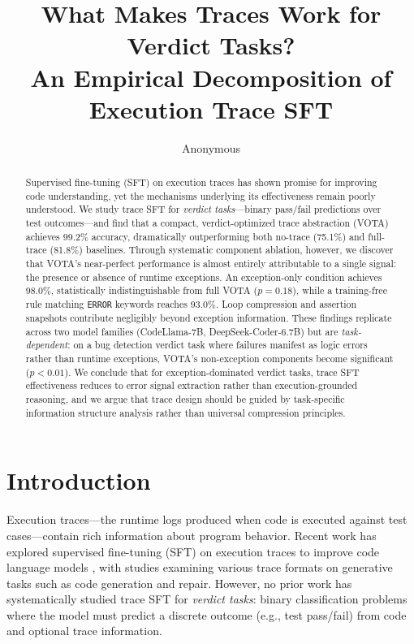 \documentclass[11pt,a4paper]{article}
\title{What Makes Traces Work for Verdict Tasks?\\An Empirical Decomposition of Execution Trace SFT}
\author{Anonymous}
\date{}
\begin{document}
\maketitle

\begin{abstract}
Supervised fine-tuning (SFT) on execution traces has shown promise for improving code understanding, yet the mechanisms underlying its effectiveness remain poorly understood.
We study trace SFT for \emph{verdict tasks}---binary pass/fail predictions over test outcomes---and find that a compact, verdict-optimized trace abstraction (VOTA) achieves 99.2\% accuracy, dramatically outperforming both no-trace (75.1\%) and full-trace (81.8\%) baselines.
Through systematic component ablation, however, we discover that VOTA's near-perfect performance is almost entirely attributable to a single signal: the presence or absence of runtime exceptions.
An exception-only condition achieves 98.0\%, statistically indistinguishable from full VOTA ($p=0.18$), while a training-free rule matching \texttt{ERROR} keywords reaches 93.0\%.
Loop compression and assertion snapshots contribute negligibly beyond exception information.
These findings replicate across two model families (CodeLlama-7B, DeepSeek-Coder-6.7B) but are \emph{task-dependent}: on a bug detection verdict task where failures manifest as logic errors rather than runtime exceptions, VOTA's non-exception components become significant ($p<0.01$).
We conclude that for exception-dominated verdict tasks, trace SFT effectiveness reduces to error signal extraction rather than execution-grounded reasoning, and we argue that trace design should be guided by task-specific information structure analysis rather than universal compression principles.
\end{abstract}

\section{Introduction}
\label{sec:intro}

Execution traces---the runtime logs produced when code is executed against test cases---contain rich information about program behavior.
Recent work has explored supervised fine-tuning (SFT) on execution traces to improve code language models \cite{ni2024next,jain2024traced,shi2024tracepile}, with studies examining various trace formats on generative tasks such as code generation and repair.
However, no prior work has systematically studied trace SFT for \emph{verdict tasks}: binary classification problems where the model must predict a discrete outcome (e.g., test pass/fail) from code and optional trace information.
\end{document}
